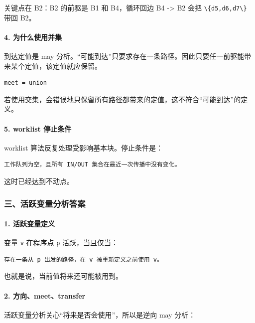 \documentclass[UTF8]{ctexart}
\begin{document}
关键点在 B2：B2 的前驱是 B1 和 B4，循环回边 B4 -> B2 会把 \texttt{\textbackslash{}\{d5,d6,d7\textbackslash{}\}} 带回 B2。

\paragraph*{4. 为什么使用并集}

到达定值是 may 分析。“可能到达”只要求存在一条路径。因此只要任一前驱能带来某个定值，该定值就应保留。

\begin{Verbatim}[fontsize=\small,breaklines=true]
meet = union
\end{Verbatim}

若使用交集，会错误地只保留所有路径都带来的定值，这不符合“可能到达”的定义。

\paragraph*{5. worklist 停止条件}

worklist 算法反复处理受影响基本块。停止条件是：

\begin{Verbatim}[fontsize=\small,breaklines=true]
工作队列为空，且所有 IN/OUT 集合在最近一次传播中没有变化。
\end{Verbatim}

这时已经达到不动点。

\subsubsection*{三、活跃变量分析答案}

\paragraph*{1. 活跃变量定义}

变量 \texttt{v} 在程序点 \texttt{p} 活跃，当且仅当：

\begin{Verbatim}[fontsize=\small,breaklines=true]
存在一条从 p 出发的路径，在 v 被重新定义之前使用 v。
\end{Verbatim}

也就是说，当前值将来还可能被用到。

\paragraph*{2. 方向、meet、transfer}

活跃变量分析关心“将来是否会使用”，所以是逆向 may 分析：
\end{document}
